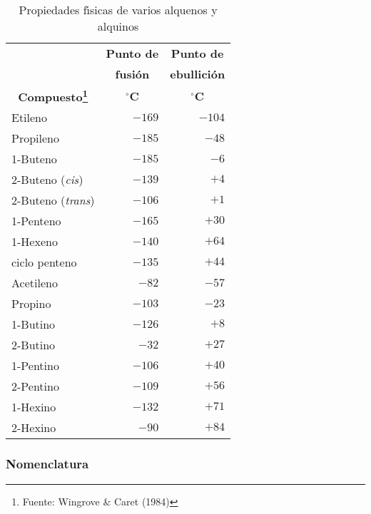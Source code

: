 \begin{table}[hbt]
\begin{minipage}{\linewidth}
\caption[Propiedades de Insaturados]{Propiedades f\'{\i}sicas de varios alquenos y alquinos}
\label{prop:1}
\begin{center}
{\small \begin{tabular}{lr r}\hline
&\multicolumn{1}{c}{\textbf{Punto de}}&
\multicolumn{1}{c}{\textbf{Punto de }}\\ 
&\multicolumn{1}{c}{\textbf{ fusi\'on}}&
\multicolumn{1}{c}{\textbf{ ebullici\'on}}\\
\multicolumn{1}{c}{\textbf{Compuesto\footnote{Fuente: Wingrove \& Caret (1984)}}} &\multicolumn{1}{c}{$^\circ$\textbf{C}}&
\multicolumn{1}{c}{$^\circ$\textbf{C}}\\\hline
 Etileno &                  $-169$& $-104$\\
 Propileno&               $-185$& $-48$ \\
1-Buteno&                 $-185$& $-6$\\
2-Buteno (\textit{cis})&  $-139$& $+4$ \\
2-Buteno (\textit{trans})&$-106$& $+1$ \\
1-Penteno                &$-165$& $+30$ \\
1-Hexeno                & $-140$& $+64$\\
ciclo penteno           &$-135$& $+44$\\
 Acetileno                 &$  -82$& $-57$\\
 Propino                   &$-103$& $-23$\\
 1-Butino                  &$-126$& $+8$\\
2-Butino                 &$   -32$& $+27$\\ 
1-Pentino                &$-106$& $+40$\\
2-Pentino                &$-109$& $+56$\\
1-Hexino                 &$-132$& $+71$\\
2-Hexino                 &$  -90$& $+84$\\
\hline \hline
\end{tabular}}
\end{center}
\end{minipage}
\end{table}


\subsubsection{Nomenclatura}


